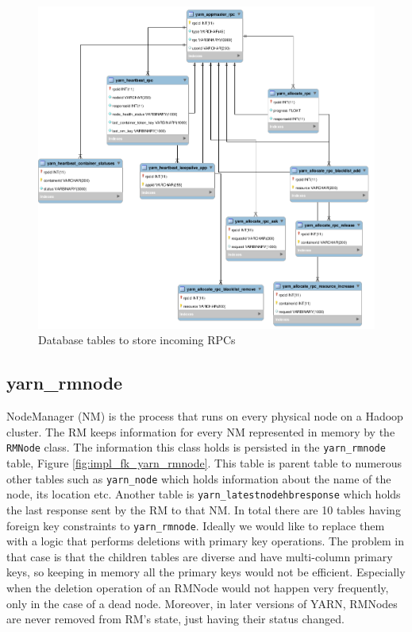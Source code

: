 \begin{figure}
\centering
\includegraphics[scale=0.4]{resources/images/Implementation/hops_yarn_ndb_schema_rpc.png}
\caption{Database tables to store incoming RPCs}
\label{fig:impl_fk_yarn_rpc}
\end{figure}

\subsection{yarn\_rmnode}
\label{ssec:impl_fk_rmnode}
NodeManager (NM) is the process that runs on every physical node on a
Hadoop cluster. The RM keeps information for every NM
represented in memory by the \texttt{RMNode} class. The information this
class holds is persisted in the \texttt{yarn\_rmnode} table, Figure
\ref{fig:impl_fk_yarn_rmnode}. This table is parent table to
numerous other tables such as \texttt{yarn\_node} which holds
information about the name of the node, its location etc. Another
table is
\texttt{yarn\_latestnodehbresponse} which holds the last response sent
by the RM to that NM. In total there are 10 tables having foreign key
constraints to \texttt{yarn\_rmnode}. Ideally we would like to replace
them with a logic that performs deletions with primary key
operations. The problem in that case is that the children tables are
diverse and have multi-column primary keys, so keeping in memory all
the primary keys would not be efficient. Especially when the deletion
operation of an RMNode would not happen very frequently, only in the case
of a dead node. Moreover, in later versions of YARN, RMNodes are never
removed from RM's state, just having their status changed.

